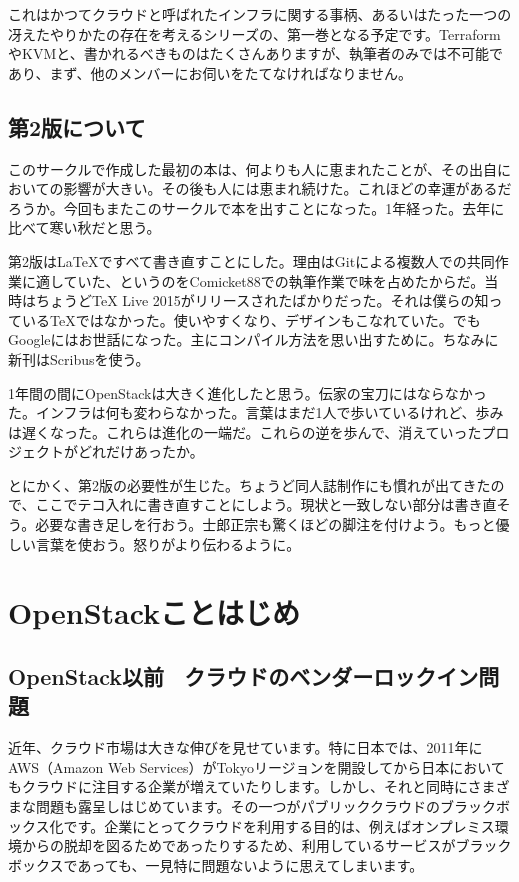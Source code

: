 \documentclass[9pt,b5paper,tombo,openany,dvipdfmx]{jsbook}
\begin{document}
これはかつてクラウドと呼ばれたインフラに関する事柄、あるいはたった一つの冴えたやりかたの存在を考えるシリーズの、第一巻となる予定です。TerraformやKVMと、書かれるべきものはたくさんありますが、執筆者のみでは不可能であり、まず、他のメンバーにお伺いをたてなければなりません。

\section{第2版について}

このサークルで作成した最初の本は、何よりも人に恵まれたことが、その出自においての影響が大きい。その後も人には恵まれ続けた。これほどの幸運があるだろうか。今回もまたこのサークルで本を出すことになった。1年経った。去年に比べて寒い秋だと思う。

第2版は\LaTeX ですべて書き直すことにした。理由はGitによる複数人での共同作業に適していた、というのをComicket88での執筆作業で味を占めたからだ。当時はちょうどTeX Live 2015がリリースされたばかりだった。それは僕らの知っているTeXではなかった。使いやすくなり、デザインもこなれていた。でもGoogleにはお世話になった。主にコンパイル方法を思い出すために。ちなみに新刊はScribusを使う。

1年間の間にOpenStackは大きく進化したと思う。伝家の宝刀にはならなかった。インフラは何も変わらなかった。言葉はまだ1人で歩いているけれど、歩みは遅くなった。これらは進化の一端だ。これらの逆を歩んで、消えていったプロジェクトがどれだけあったか。

とにかく、第2版の必要性が生じた。ちょうど同人誌制作にも慣れが出てきたので、ここでテコ入れに書き直すことにしよう。現状と一致しない部分は書き直そう。必要な書き足しを行おう。士郎正宗も驚くほどの脚注を付けよう。もっと優しい言葉を使おう。怒りがより伝わるように。

\chapter{OpenStackことはじめ}

\startcontents[sections]


\section{OpenStack以前 ~クラウドのベンダーロックイン問題}

近年、クラウド市場は大きな伸びを見せています。特に日本では、2011年にAWS（Amazon Web Services）がTokyoリージョンを開設してから日本においてもクラウドに注目する企業が増えていたりします。しかし、それと同時にさまざまな問題も露呈しはじめています。その一つがパブリッククラウドのブラックボックス化です。企業にとってクラウドを利用する目的は、例えばオンプレミス環境からの脱却を図るためであったりするため、利用しているサービスがブラックボックスであっても、一見特に問題ないように思えてしまいます。
\end{document}

